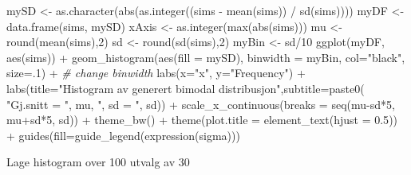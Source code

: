 \documentclass[
]{book}
\newenvironment{Shaded}{\begin{snugshade}}{\end{snugshade}}
\newcommand{\AttributeTok}[1]{\textcolor[rgb]{0.77,0.63,0.00}{#1}}
\newcommand{\CommentTok}[1]{\textcolor[rgb]{0.56,0.35,0.01}{\textit{#1}}}
\newcommand{\DecValTok}[1]{\textcolor[rgb]{0.00,0.00,0.81}{#1}}
\newcommand{\FloatTok}[1]{\textcolor[rgb]{0.00,0.00,0.81}{#1}}
\newcommand{\FunctionTok}[1]{\textcolor[rgb]{0.00,0.00,0.00}{#1}}
\newcommand{\NormalTok}[1]{#1}
\newcommand{\OtherTok}[1]{\textcolor[rgb]{0.56,0.35,0.01}{#1}}
\newcommand{\SpecialCharTok}[1]{\textcolor[rgb]{0.00,0.00,0.00}{#1}}
\newcommand{\StringTok}[1]{\textcolor[rgb]{0.31,0.60,0.02}{#1}}
\begin{document}
\begin{Shaded}
\begin{Highlighting}[]
\NormalTok{mySD }\OtherTok{\textless{}{-}} \FunctionTok{as.character}\NormalTok{(}\FunctionTok{abs}\NormalTok{(}\FunctionTok{as.integer}\NormalTok{((sims }\SpecialCharTok{{-}} \FunctionTok{mean}\NormalTok{(sims)) }\SpecialCharTok{/} \FunctionTok{sd}\NormalTok{(sims))))}
\NormalTok{myDF }\OtherTok{\textless{}{-}} \FunctionTok{data.frame}\NormalTok{(sims, mySD)}
\NormalTok{xAxis }\OtherTok{\textless{}{-}} \FunctionTok{as.integer}\NormalTok{(}\FunctionTok{max}\NormalTok{(}\FunctionTok{abs}\NormalTok{(sims)))}
\NormalTok{mu }\OtherTok{\textless{}{-}} \FunctionTok{round}\NormalTok{(}\FunctionTok{mean}\NormalTok{(sims),}\DecValTok{2}\NormalTok{)}
\NormalTok{sd }\OtherTok{\textless{}{-}} \FunctionTok{round}\NormalTok{(}\FunctionTok{sd}\NormalTok{(sims),}\DecValTok{2}\NormalTok{)}
\NormalTok{myBin }\OtherTok{\textless{}{-}}\NormalTok{ sd}\SpecialCharTok{/}\DecValTok{10}
\FunctionTok{ggplot}\NormalTok{(myDF, }\FunctionTok{aes}\NormalTok{(sims)) }\SpecialCharTok{+}
  \FunctionTok{geom\_histogram}\NormalTok{(}\FunctionTok{aes}\NormalTok{(}\AttributeTok{fill =}\NormalTok{ mySD), }\AttributeTok{binwidth =}\NormalTok{ myBin, }\AttributeTok{col=}\StringTok{"black"}\NormalTok{, }\AttributeTok{size=}\NormalTok{.}\DecValTok{1}\NormalTok{) }\SpecialCharTok{+}  \CommentTok{\# change binwidth}
  \FunctionTok{labs}\NormalTok{(}\AttributeTok{x=}\StringTok{"x"}\NormalTok{, }\AttributeTok{y=}\StringTok{"Frequency"}\NormalTok{) }\SpecialCharTok{+} 
  \FunctionTok{labs}\NormalTok{(}\AttributeTok{title=}\StringTok{"Histogram av generert bimodal distribusjon"}\NormalTok{,}\AttributeTok{subtitle=}\FunctionTok{paste0}\NormalTok{(  }\StringTok{"Gj.snitt = "}\NormalTok{, mu, }\StringTok{", sd = "}\NormalTok{, sd)) }\SpecialCharTok{+}
  \FunctionTok{scale\_x\_continuous}\NormalTok{(}\AttributeTok{breaks =} \FunctionTok{seq}\NormalTok{(mu}\SpecialCharTok{{-}}\NormalTok{sd}\SpecialCharTok{*}\DecValTok{5}\NormalTok{, mu}\SpecialCharTok{+}\NormalTok{sd}\SpecialCharTok{*}\DecValTok{5}\NormalTok{, sd)) }\SpecialCharTok{+}
  \FunctionTok{theme\_bw}\NormalTok{() }\SpecialCharTok{+}
  \FunctionTok{theme}\NormalTok{(}\AttributeTok{plot.title =} \FunctionTok{element\_text}\NormalTok{(}\AttributeTok{hjust =} \FloatTok{0.5}\NormalTok{)) }\SpecialCharTok{+}
  \FunctionTok{guides}\NormalTok{(}\AttributeTok{fill=}\FunctionTok{guide\_legend}\NormalTok{(}\FunctionTok{expression}\NormalTok{(sigma))) }
\end{Highlighting}
\end{Shaded}

Lage histogram over 100 utvalg av 30
\end{document}
